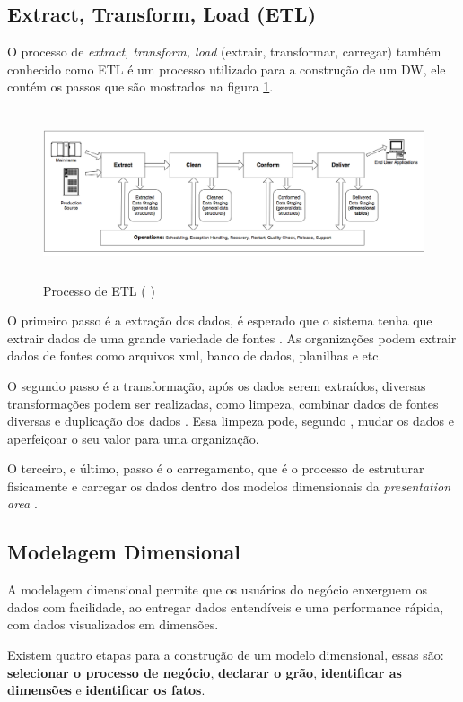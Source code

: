 \subsection{Extract, Transform, Load (ETL)}
O processo de \textit{extract, transform, load} (extrair, transformar, carregar) também conhecido como ETL é um processo utilizado para a construção de um DW, ele contém os passos que são mostrados na figura \ref{etl}. 
\begin{figure}[H]
\centering
\includegraphics[height=5cm]{imagens/dw_process.png}
\caption{Processo de ETL (\citeauthor{kimball2004} \citeyear{kimball2004})}
\label{etl}
\end{figure}
O primeiro passo é a extração dos dados, é esperado que o sistema tenha que extrair dados de uma grande variedade de fontes \citep{kimball2013}. As organizações podem extrair dados de fontes como arquivos xml, banco de dados, planilhas e etc.

O segundo passo é a transformação, após os dados serem extraídos, diversas transformações podem ser realizadas, como limpeza, combinar dados de fontes diversas e duplicação dos dados \citep{kimball2013}. Essa limpeza pode, segundo , mudar os dados e aperfeiçoar o seu valor para uma organização.

O terceiro, e último, passo é o carregamento, que é o processo de estruturar fisicamente e carregar os dados dentro dos modelos dimensionais da \textit{presentation area} \citep{kimball2013}.

\subsection{Modelagem Dimensional}
A modelagem dimensional permite que os usuários do negócio enxerguem os dados com facilidade, ao entregar dados entendíveis e uma performance rápida, com dados visualizados em dimensões.

Existem quatro etapas para a construção de um modelo dimensional, essas são: \textbf{selecionar o processo de negócio}, \textbf{declarar o grão}, \textbf{identificar as dimensões} e \textbf{identificar os fatos}. 

